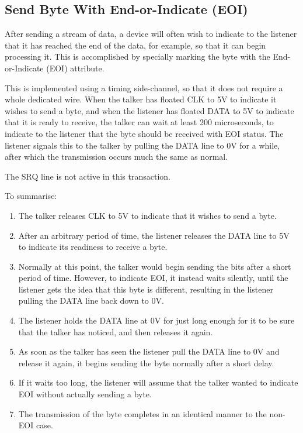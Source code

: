 \subsection{Send Byte With End-or-Indicate (EOI)}

After sending a stream of data, a device will often wish to indicate
to the listener that it has reached the end of the data, for example,
so that it can begin processing it.  This is accomplished by specially
marking the byte with the End-or-Indicate (EOI) attribute.

This is
implemented using a timing side-channel, so that it does not require a
whole dedicated wire. When the talker has floated CLK to 5V to indicate it
wishes to send a byte, and when the listener has floated DATA to 5V to
indicate that it is ready to receive, the talker can wait at least 200
microseconds, to indicate to the listener that the byte should be
received with EOI status.  The listener signals this to the talker by
pulling the DATA line to 0V for a while, after which the transmission
occurs much the same as normal.

The SRQ line is not active in this transaction.

To summarise:

\begin{enumerate}
\item The talker releases CLK to 5V to indicate that it wishes to
  send a byte.
\item After an arbitrary period of time, the listener releases the
  DATA line to 5V to indicate its readiness to receive a byte.
\item Normally at this point, the talker would begin sending the bits
  after a short period of time.  However, to indicate EOI, it instead
  waits silently, until the listener gets the idea that this byte is
  different, resulting in the listener pulling the DATA line back down
  to 0V.
\item The listener holds the DATA line at 0V for just long enough
  for it to be sure that the talker has noticed, and then releases
  it again.
\item As soon as the talker has seen the listener pull the DATA
  line to 0V and release it again, it begins sending the byte
  normally after a short delay.
\item If it waits too long, the listener will assume that the talker
  wanted to indicate EOI without actually sending a byte.
  \item The transmission of the byte completes in an identical manner
    to the non-EOI case.
\end{enumerate}


